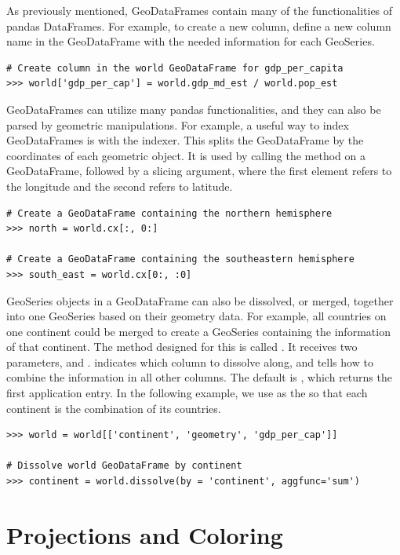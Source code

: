 As previously mentioned, GeoDataFrames contain many of the functionalities of pandas DataFrames.
For example, to create a new column, define a new column name in the GeoDataFrame with the needed information for each GeoSeries.

\begin{lstlisting}
# Create column in the world GeoDataFrame for gdp_per_capita
>>> world['gdp_per_cap'] = world.gdp_md_est / world.pop_est
\end{lstlisting}

GeoDataFrames can utilize many pandas functionalities, and they can also be parsed by geometric manipulations.
For example, a useful way to index GeoDataFrames is with the  indexer.
This splits the GeoDataFrame by the coordinates of each geometric object.
It is used by calling the method  on a GeoDataFrame, followed by a slicing argument, where the first element refers to the longitude and the second refers to latitude.

\begin{lstlisting}
# Create a GeoDataFrame containing the northern hemisphere
>>> north = world.cx[:, 0:]

# Create a GeoDataFrame containing the southeastern hemisphere
>>> south_east = world.cx[0:, :0]
\end{lstlisting}

GeoSeries objects in a GeoDataFrame can also be dissolved, or merged, together into one GeoSeries based on their geometry data.
For example, all countries on one continent could be merged to create a GeoSeries containing the information of that continent.
The method designed for this is called .
It receives two parameters,  and .
 indicates which column to dissolve along, and  tells how to combine the information in all other columns.
The default  is , which returns the first application entry.
In the following example, we use  as the  so that each continent is the combination of its countries.

\begin{lstlisting}
>>> world = world[['continent', 'geometry', 'gdp_per_cap']]

# Dissolve world GeoDataFrame by continent
>>> continent = world.dissolve(by = 'continent', aggfunc='sum')
\end{lstlisting}


\section*{Projections and Coloring} %

